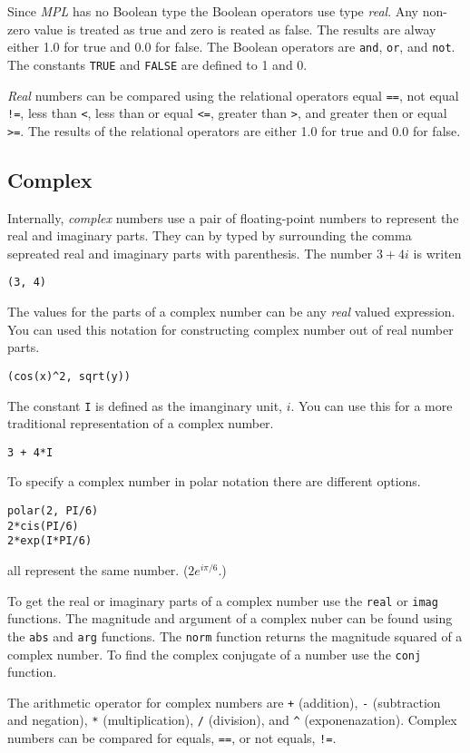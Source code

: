 \documentclass{article}
\begin{document}
Since \emph{MPL} has no Boolean type the Boolean operators use type \emph{real}.
Any non-zero value is treated as true and zero is reated as false.
The results are alway either 1.0 for true and 0.0 for false.
The Boolean operators are \verb|and|, \verb|or|, and \verb|not|.
The constants \verb|TRUE| and \verb|FALSE| are defined to 1 and 0.

\emph{Real} numbers can be compared using the relational operators
equal \verb|==|, not equal \verb|!=|, less than \verb|<|, less than or equal \verb|<=|, greater than \verb|>|, and greater then or equal \verb|>=|.  The results of the relational operators are either 1.0 for true and 0.0 for false.


\subsection{Complex}
Internally, \emph{complex} numbers use a pair of floating-point numbers to represent the real and imaginary
parts. They can by typed by surrounding the comma sepreated real and imaginary parts with parenthesis.
The number $3 + 4i$ is writen
\begin{verbatim}
(3, 4)
\end{verbatim}
The values for the parts of a complex number can be any \emph{real} valued
expression.
You can used this notation for constructing complex number out of
real number parts.
\begin{verbatim}
(cos(x)^2, sqrt(y))
\end{verbatim}
The constant \verb|I| is defined as the imanginary unit, $i$. You can use this for a more traditional
representation of a complex number.
\begin{verbatim}
3 + 4*I
\end{verbatim}

To specify a complex number in polar notation there are different options.
\begin{verbatim}
polar(2, PI/6)
2*cis(PI/6)
2*exp(I*PI/6)
\end{verbatim}
all represent the same number. ($2e^{i \pi/6}$.)

To get the real or imaginary parts of a complex number use
the \verb|real| or \verb|imag| functions.
The magnitude and argument of a complex nuber can be found using
the \verb|abs| and \verb|arg| functions.
The \verb|norm| function returns the magnitude squared of a
complex number. To find the complex conjugate of a number
use the \verb|conj| function.

The arithmetic operator for complex numbers are \verb|+| (addition),
\verb|-| (subtraction and negation), \verb|*| (multiplication),
\verb|/| (division), and \verb|^| (exponenazation).
Complex numbers can be compared for equals, \verb|==|,
or not equals, \verb|!=|.
\end{document}
